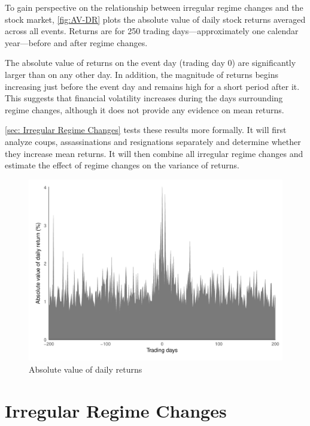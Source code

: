 \documentclass[12pt,final,fleqn]{article}
\theoremstyle{plain}
\begin{document}
To gain perspective on the relationship between irregular regime changes and the stock market, \autoref{fig:AV-DR} plots the absolute value of daily stock returns averaged across all events. Returns are for 250 trading days---approximately one calendar year---before and after regime changes.

The absolute value of returns on the event day (trading day 0) are significantly larger than on any other day. In addition, the magnitude of returns begins increasing just before the event day and remains high for a short period after it. This suggests that financial volatility increases during the days surrounding regime changes, although it does not provide any evidence on mean returns.

\autoref{sec: Irregular Regime Changes} tests these results more formally. It will first analyze coups, assassinations and resignations separately and determine whether they increase mean returns. It will then combine all irregular regime changes and estimate the effect of regime changes on the variance of returns.

\begin{figure}[!ht]
\includegraphics{../figs/daily_mean_absreturn.pdf}
\caption{Absolute value of daily returns}
\label{fig:AV-DR}
\end{figure}


\section{Irregular Regime Changes} \label{sec: Irregular Regime Changes}
\end{document}
